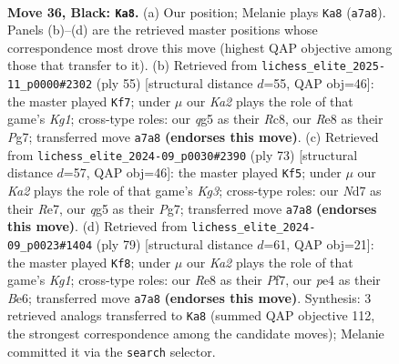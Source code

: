 \documentclass[11pt]{article}
\begin{document}
\clearpage

\begin{figure}[p]\centering
\begin{subfigure}{0.46\textwidth}\centering
\resizebox{\linewidth}{!}{%
\newchessgame
\chessboard[
  setfen={4r3/kp1np3/1r1p4/6Q1/3RP3/1PR2P2/4b1PP/K7 b - - 2 36},
  showmover=false,
  pgfstyle=straightmove, color=movearrow, markmove={a7-a8}
]}
\caption{}
\end{subfigure}\hfill
\begin{subfigure}{0.46\textwidth}\centering
\resizebox{\linewidth}{!}{%
\newchessgame
\chessboard[
  setfen={2r1r1k1/6pp/4p3/pR1p4/8/2P1R1P1/P4P1P/6K1 b - - 3 28},
  showmover=false,
  pgfstyle=straightmove, color=movearrow, markmove={g8-f7}
]}
\caption{}
\end{subfigure}
\\[4pt]
\begin{subfigure}{0.46\textwidth}\centering
\resizebox{\linewidth}{!}{%
\newchessgame
\chessboard[
  setfen={8/2r1r1pp/R3p1k1/p2p4/8/2P1R1P1/P4P1P/6K1 b - - 21 37},
  showmover=false,
  pgfstyle=straightmove, color=movearrow, markmove={g6-f5}
]}
\caption{}
\end{subfigure}\hfill
\begin{subfigure}{0.46\textwidth}\centering
\resizebox{\linewidth}{!}{%
\newchessgame
\chessboard[
  setfen={3r2k1/3P1pp1/1rB1b2p/1pR5/1P5P/6P1/3R1P2/6K1 b - - 0 40},
  showmover=false,
  pgfstyle=straightmove, color=movearrow, markmove={g8-f8}
]}
\caption{}
\end{subfigure}
\caption{\textbf{Move 36, Black: \texttt{Ka8}.} (a) Our position; Melanie plays \texttt{Ka8} (\texttt{a7a8}). Panels (b)--(d) are the retrieved master positions whose correspondence most drove this move (highest QAP objective among those that transfer to it). (b) Retrieved from \texttt{lichess\_elite\_2025-11\_p0000\#2302} (ply 55) [structural distance $d$=55, QAP obj=46]: the master played \texttt{Kf7}; under $\mu$ our \emph{Ka2} plays the role of that game's \emph{Kg1}; cross-type roles: our \emph{q}g5 as their \emph{R}c8, our \emph{R}e8 as their \emph{P}g7; transferred move \texttt{a7a8} \textbf{(endorses this move)}. (c) Retrieved from \texttt{lichess\_elite\_2024-09\_p0030\#2390} (ply 73) [structural distance $d$=57, QAP obj=46]: the master played \texttt{Kf5}; under $\mu$ our \emph{Ka2} plays the role of that game's \emph{Kg3}; cross-type roles: our \emph{N}d7 as their \emph{R}e7, our \emph{q}g5 as their \emph{P}g7; transferred move \texttt{a7a8} \textbf{(endorses this move)}. (d) Retrieved from \texttt{lichess\_elite\_2024-09\_p0023\#1404} (ply 79) [structural distance $d$=61, QAP obj=21]: the master played \texttt{Kf8}; under $\mu$ our \emph{Ka2} plays the role of that game's \emph{Kg1}; cross-type roles: our \emph{R}e8 as their \emph{P}f7, our \emph{p}e4 as their \emph{B}e6; transferred move \texttt{a7a8} \textbf{(endorses this move)}. Synthesis: 3 retrieved analogs transferred to \texttt{Ka8} (summed QAP objective 112, the strongest correspondence among the candidate moves); Melanie committed it via the \texttt{search} selector.}
\label{fig:thought-m71}
\end{figure}
\end{document}
